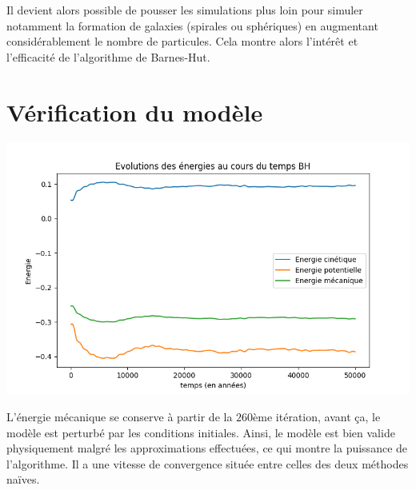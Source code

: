 Il devient alors possible de pousser les simulations plus loin pour simuler notamment la formation de galaxies (spirales ou sphériques) en augmentant considérablement le nombre de particules. Cela montre alors l'intérêt et l'efficacité de l'algorithme de Barnes-Hut.

\section{Vérification du modèle}

\begin{center}
\includegraphics[scale=0.6]{./resultats/Energy_BH.png}
\captionsetup{hypcap=false}
\label{fig9}
\end{center}

L'énergie mécanique se conserve à partir de la $260$ème itération, avant ça, le modèle est perturbé par les conditions initiales. Ainsi, le modèle est bien valide physiquement malgré les approximations effectuées, ce qui montre la puissance de l'algorithme. Il a une vitesse de convergence située entre celles des deux méthodes naïves.
